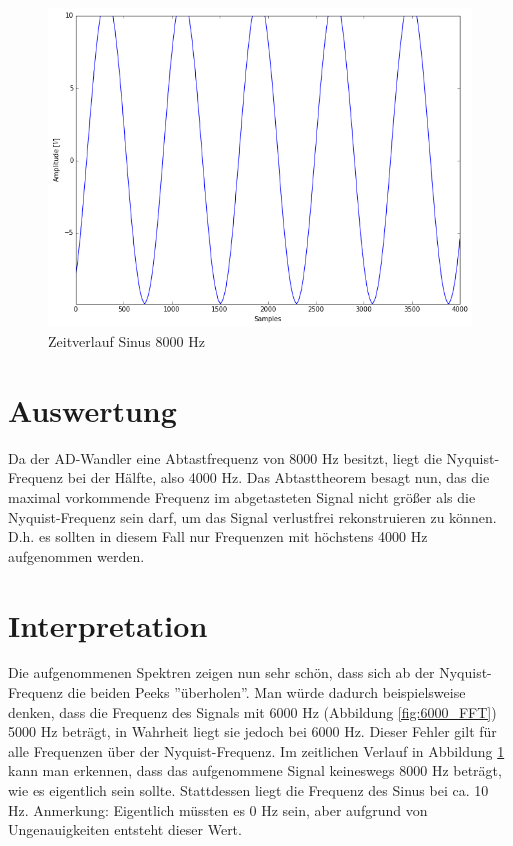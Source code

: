 \documentclass[12pt,oneside,a4paper]{report}
\begin{document}
\begin{figure}[H]
\centering\small
\includegraphics[scale=0.4]{src/Sinus8000Hz.png}
\caption{Zeitverlauf Sinus 8000 Hz}
\label{fig:8000_TIME}
\end{figure}

\section{Auswertung}
\label{chap:VERSUCH_4_AUSWERTUNG}

Da der AD-Wandler eine Abtastfrequenz von 8000 Hz besitzt, liegt die Nyquist-Frequenz bei der Hälfte, also 4000 Hz.
Das Abtasttheorem besagt nun, das die maximal vorkommende Frequenz im abgetasteten Signal nicht größer als die Nyquist-Frequenz sein darf, um das Signal verlustfrei rekonstruieren zu können. D.h. es sollten in diesem Fall nur Frequenzen mit höchstens 4000 Hz aufgenommen werden.

\section{Interpretation}
\label{chap:VERSUCH_4_INTERPRETATION}

Die aufgenommenen Spektren zeigen nun sehr schön, dass sich ab der Nyquist-Frequenz die beiden Peeks ''überholen''.
Man würde dadurch beispielsweise denken, dass die Frequenz des Signals mit 6000 Hz (Abbildung \ref{fig:6000_FFT}) 5000 Hz beträgt, in Wahrheit liegt sie jedoch bei 6000 Hz.
Dieser Fehler gilt für alle Frequenzen über der Nyquist-Frequenz.
Im zeitlichen Verlauf in Abbildung \ref{fig:8000_TIME} kann man erkennen, dass das aufgenommene Signal keineswegs 8000 Hz beträgt, wie es eigentlich sein sollte. Stattdessen liegt die Frequenz des Sinus bei ca. 10 Hz.
Anmerkung: Eigentlich müssten es 0 Hz sein, aber aufgrund von Ungenauigkeiten entsteht dieser Wert.
\end{document}

